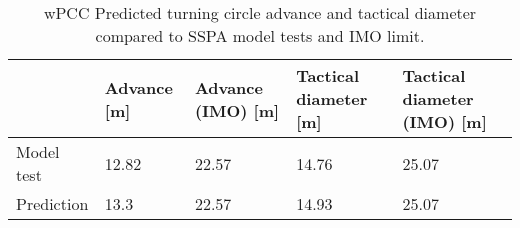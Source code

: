 \begin{table}[!htb]
    \footnotesize
    \caption{wPCC Predicted turning circle advance and tactical diameter compared to SSPA model tests and IMO limit.}
    \label{\detokenize{06.10_results_wpcc:tab-wpcc-advance}}
    \centering
    \begin{tabular}{|T|T|T|T|T|}
\hline
&

Advance {[}m{]}
&

Advance (IMO) {[}m{]}
&

Tactical diameter {[}m{]}
&

Tactical diameter (IMO) {[}m{]}
\\
\hline

Model test
&

12.82
&

22.57
&

14.76
&

25.07
\\

Prediction
&

13.3
&

22.57
&

14.93
&

25.07
\\
\hline
\end{tabular}

\end{table}

